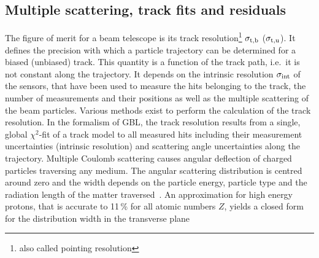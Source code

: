 \subsection{Multiple scattering, track fits and residuals}
\label{sec:resmultiple}

The figure of merit for a beam telescope is its track resolution\footnote{also called pointing resolution} $\sigma_{\textrm{t,b}}$ ($\sigma_{\textrm{t,u}}$).
It defines the precision with which a particle trajectory can be determined for a biased (unbiased) track. 
This quantity is a function of the track path, i.e.\ it is not constant along the trajectory. 
It depends on the intrinsic resolution $\sigma_{\textrm{int}}$ of the sensors, that have been used to measure the hits belonging to the track, the number of measurements and their positions
 as well as the multiple scattering of the beam particles.
Various methods exist to perform the calculation of the track resolution. 
In the formalism of GBL, the track resolution results from a single, global $\chi^2$-fit of a track model to all measured hits including their measurement uncertainties (intrinsic resolution)
 and scattering angle uncertainties along the trajectory. 
% 
%
%
%
%
%
Multiple Coulomb scattering causes angular deflection of charged particles traversing any medium.
The angular scattering distribution is centred around zero
 and the width depends on the particle energy, particle type and the radiation length of the matter traversed~\cite{ref:scatteringhighland}.
An approximation for high energy protons, that is accurate to 11\,\% for all atomic numbers $Z$, yields a closed form for the distribution width in the transverse plane~\cite{ref:PDG-2014}

